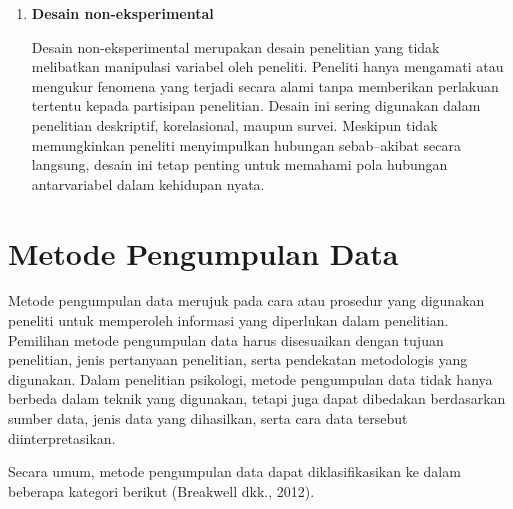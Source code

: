 \documentclass[
  indonesian,
  letterpaper,
  DIV=11,
  numbers=noendperiod]{scrreprt}
\begin{document}
\begin{enumerate}
\begin{enumerate}
    Desain kuasi-eksperimental memiliki karakteristik yang mirip dengan
    desain eksperimen karena sama-sama melibatkan pemberian perlakuan
    terhadap partisipan penelitian. Namun, dalam desain ini peneliti
    tidak memiliki kendali penuh terhadap proses penentuan kelompok
    partisipan, misalnya karena tidak memungkinkan melakukan
    randomisasi. Akibatnya, tingkat kontrol terhadap variabel luar tidak
    sekuat pada desain eksperimen murni. Meskipun demikian, desain ini
    tetap banyak digunakan dalam penelitian sosial dan pendidikan karena
    dapat diterapkan dalam situasi penelitian yang lebih realistis.
  \item
    \textbf{Desain non-eksperimental}

    Desain non-eksperimental merupakan desain penelitian yang tidak
    melibatkan manipulasi variabel oleh peneliti. Peneliti hanya
    mengamati atau mengukur fenomena yang terjadi secara alami tanpa
    memberikan perlakuan tertentu kepada partisipan penelitian. Desain
    ini sering digunakan dalam penelitian deskriptif, korelasional,
    maupun survei. Meskipun tidak memungkinkan peneliti menyimpulkan
    hubungan sebab--akibat secara langsung, desain ini tetap penting
    untuk memahami pola hubungan antarvariabel dalam kehidupan nyata.
  \end{enumerate}
\end{enumerate}

\section{Metode Pengumpulan Data}\label{metode-pengumpulan-data}

Metode pengumpulan data merujuk pada cara atau prosedur yang digunakan
peneliti untuk memperoleh informasi yang diperlukan dalam penelitian.
Pemilihan metode pengumpulan data harus disesuaikan dengan tujuan
penelitian, jenis pertanyaan penelitian, serta pendekatan metodologis
yang digunakan. Dalam penelitian psikologi, metode pengumpulan data
tidak hanya berbeda dalam teknik yang digunakan, tetapi juga dapat
dibedakan berdasarkan sumber data, jenis data yang dihasilkan, serta
cara data tersebut diinterpretasikan.

Secara umum, metode pengumpulan data dapat diklasifikasikan ke dalam
beberapa kategori berikut (Breakwell dkk., 2012).
\end{document}
